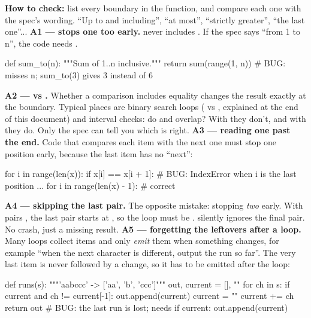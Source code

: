 \documentclass[10pt,a4paper]{article}
\begin{document}
\textbf{How to check:} list every boundary in the function, and compare each one with the spec’s wording. “Up to and including”, “at most”, “strictly greater”, “the last one”...
\textbf{A1 —  stops one too early.}  never includes . If the spec says “from 1 to n”, the code needs .
\begin{pycode}
def sum_to(n):
    """Sum of 1..n inclusive."""
    return sum(range(1, n))        # BUG: misses n; sum_to(3) gives 3 instead of 6
\end{pycode}
\textbf{A2 — \code{\textless{}\allowbreak{}} vs \code{\textless{}\allowbreak{}=\allowbreak{}}.} Whether a comparison includes equality changes the result exactly at the boundary. Typical places are binary search loops ( vs , explained at the end of this document) and interval checks: do \code{[1,\allowbreak{}\ 3]} and \code{[3,\allowbreak{}\ 5]} overlap? With  they don’t, and with  they do. Only the spec can tell you which is right.
\textbf{A3 — reading one past the end.} Code that compares each item with the next one must stop one position early, because the last item has no “next”:
\begin{pycode}
for i in range(len(x)):
    if x[i] == x[i + 1]:          # BUG: IndexError when i is the last position
        ...
for i in range(len(x) - 1):       # correct
\end{pycode}
\textbf{A4 — skipping the last pair.} The opposite mistake: stopping \emph{two} early. With pairs , the last pair starts at , so the loop must be .  silently ignores the final pair. No crash, just a missing result.
\textbf{A5 — forgetting the leftovers after a loop.} Many loops collect items and only \emph{emit} them when something changes, for example “when the next character is different, output the run so far”. The very last item is never followed by a change, so it has to be emitted after the loop:
\begin{pycode}
def runs(s):
    """'aabccc' -> ['aa', 'b', 'ccc']"""
    out, current = [], ""
    for ch in s:
        if current and ch != current[-1]:
            out.append(current)
            current = ""
        current += ch
    return out                    # BUG: the last run is lost; needs  if current: out.append(current)
\end{pycode}
\end{document}
